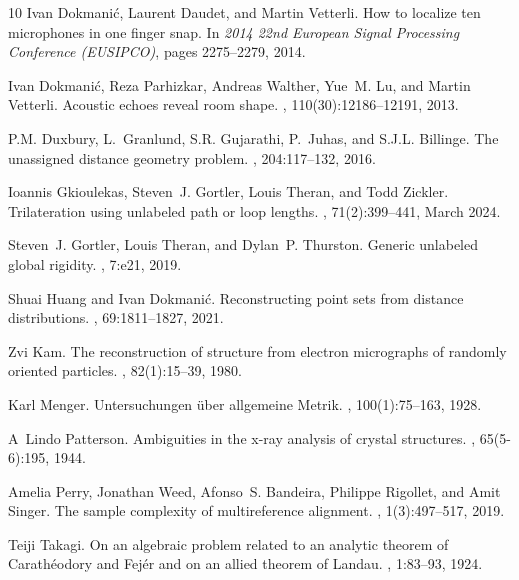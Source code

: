\documentclass{article}
\theoremstyle{definition}
\renewcommand{\|}{|}
\begin{document}
\begin{thebibliography}{10}
Ivan Dokmanić, Laurent Daudet, and Martin Vetterli.
\newblock How to localize ten microphones in one finger snap.
\newblock In {\em 2014 22nd European Signal Processing Conference (EUSIPCO)},
  pages 2275--2279, 2014.

Ivan Dokmanić, Reza Parhizkar, Andreas Walther, Yue~M. Lu, and Martin
  Vetterli.
\newblock Acoustic echoes reveal room shape.
,
  110(30):12186--12191, 2013.

P.M. Duxbury, L.~Granlund, S.R. Gujarathi, P.~Juhas, and S.J.L. Billinge.
\newblock The unassigned distance geometry problem.
, 204:117--132, 2016.

Ioannis Gkioulekas, Steven~J. Gortler, Louis Theran, and Todd Zickler.
\newblock Trilateration using unlabeled path or loop lengths.
, 71(2):399--441, March 2024.

Steven~J. Gortler, Louis Theran, and Dylan~P. Thurston.
\newblock Generic unlabeled global rigidity.
, 7:e21, 2019.

Shuai Huang and Ivan Dokmanić.
\newblock Reconstructing point sets from distance distributions.
, 69:1811--1827, 2021.

Zvi Kam.
\newblock The reconstruction of structure from electron micrographs of randomly
  oriented particles.
, 82(1):15--39, 1980.

Karl Menger.
\newblock Untersuchungen \"{u}ber allgemeine {M}etrik.
, 100(1):75--163, 1928.

A~Lindo Patterson.
\newblock Ambiguities in the x-ray analysis of crystal structures.
, 65(5-6):195, 1944.

Amelia Perry, Jonathan Weed, Afonso~S. Bandeira, Philippe Rigollet, and Amit
  Singer.
\newblock The sample complexity of multireference alignment.
, 1(3):497--517,
  2019.

Teiji Takagi.
\newblock On an algebraic problem related to an analytic theorem of
  Carath\'eodory and Fej\'er and on an allied theorem of Landau.
,
  1:83--93, 1924.


\end{thebibliography}
\end{document}
